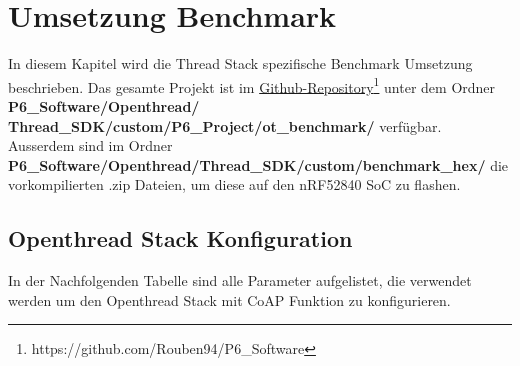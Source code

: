 \clearpage
\section{Umsetzung Benchmark}\label{sec:ThreadUmsetzungBenchmark}
In diesem Kapitel wird die Thread Stack spezifische Benchmark Umsetzung beschrieben. Das gesamte Projekt ist im \href{https://github.com/Rouben94/P6_Software}{Github-Repository\footnote{\url{https://github.com/Rouben94/P6_Software}\cite{github_p6_software_p2p_2020}}} unter dem Ordner \textbf{P6\_Software/Openthread/ Thread\_SDK/custom/P6\_Project/ot\_benchmark/} verfügbar. Ausserdem sind im Ordner \textbf{P6\_Software/Openthread/Thread\_SDK/custom/benchmark\_hex/} die vorkompilierten .zip Dateien, um diese auf den nRF52840 SoC zu flashen. 

\subsection{Openthread Stack Konfiguration}\label{subsec:ThreadStackKonfiguration}
In der Nachfolgenden Tabelle sind alle Parameter aufgelistet, die verwendet werden um den Openthread Stack mit CoAP Funktion zu konfigurieren.
